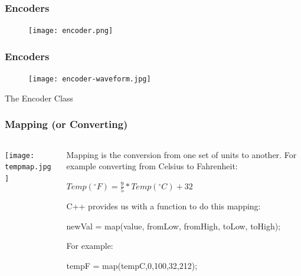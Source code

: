 \documentclass{beamer}
\begin{document}
\begin{frame}\frametitle{Encoders}
\begin{figure}[h]
	\texttt{[image: encoder.png]}
\end{figure}
\end{frame}

\begin{frame}\frametitle{Encoders}
\begin{figure}[h]
	\texttt{[image: encoder-waveform.jpg]}
\end{figure}
\end{frame}

\begin{frame}{The Encoder Class}
\lstenc
\end{frame}

\begin{frame}\frametitle{Mapping (or Converting)}
\begin{columns}
\begin{column}{5.0cm}
\texttt{[image: tempmap.jpg]}
\end{column}
\begin{column}{6.5cm}
Mapping is the conversion from one set of units to another. For example converting from Celsius to Fahrenheit: 

\begin{center}
$Temp(^{\circ} F) = \frac{9}{5} * Temp(^{\circ} C) + 32$
\end{center}

C++ provides us with a function to do this mapping:

newVal = map(value, fromLow, fromHigh, toLow, toHigh);

\smallskip
For example: 

tempF = map(tempC,0,100,32,212);

\end{column}
\end{columns}
\end{frame}
\end{document}
